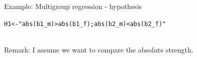 \documentclass[10pt]{beamer}\usepackage[]{graphicx}\usepackage[]{xcolor}
\makeatletter
\newcommand{\hlstr}[1]{\textcolor[rgb]{0.192,0.494,0.8}{#1}}%
\newcommand{\hlstd}[1]{\textcolor[rgb]{0.345,0.345,0.345}{#1}}%
\newcommand{\hlkwb}[1]{\textcolor[rgb]{0.69,0.353,0.396}{#1}}%
\newenvironment{kframe}{%
 \def\at@end@of@kframe{}%
 \ifinner\ifhmode%
  \def\at@end@of@kframe{\end{minipage}}%
  \begin{minipage}{\columnwidth}%
 \fi\fi%
 \def\FrameCommand##1{\hskip\@totalleftmargin \hskip-\fboxsep
 \colorbox{shadecolor}{##1}\hskip-\fboxsep
     \hskip-\linewidth \hskip-\@totalleftmargin \hskip\columnwidth}%
 \MakeFramed {\advance\hsize-\width
   \@totalleftmargin\z@ \linewidth\hsize
   \@setminipage}}%
 {\par\unskip\endMakeFramed%
 \at@end@of@kframe}
\newenvironment{knitrout}{}{} %
\makeatother
\begin{document}
%
\begin{frame}[fragile]{Example: Multigroup regression - hypothesis}


\begin{knitrout}
\color{fgcolor}\begin{kframe}
\begin{alltt}
\hlstd{H1} \hlkwb{<-} \hlstr{"abs(b1_m) > abs(b1_f);  abs(b2_m) < abs(b2_f)"}
\end{alltt}
\end{kframe}
\end{knitrout}
~\\
Remark: I assume we want to compare the absolute strength.
        
\end{frame}
%
\end{document}
